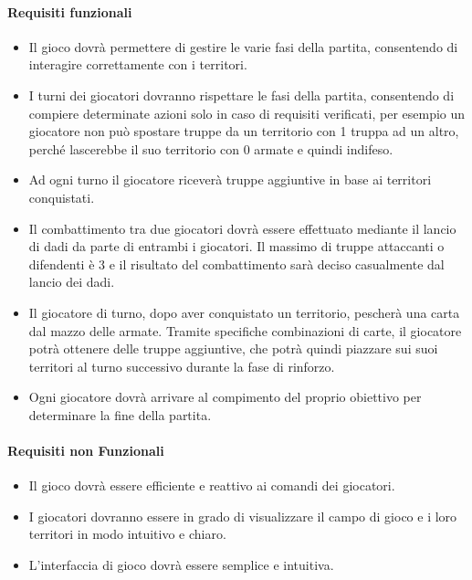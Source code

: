 \documentclass[a4paper,12pt]{report}
\begin{document}
\paragraph{Requisiti funzionali}
%
\begin{itemize}
    \item Il gioco dovr\`a permettere di gestire le varie fasi della partita, consentendo di interagire correttamente con i territori.
    \item I turni dei giocatori dovranno rispettare le fasi della partita, consentendo di compiere determinate azioni solo in caso di requisiti verificati, per esempio un giocatore non pu\`o spostare truppe da un territorio con 1 truppa ad un altro, perch\'e lascerebbe il suo territorio con 0 armate e quindi indifeso.
    \item Ad ogni turno il giocatore ricever\`a truppe aggiuntive in base ai territori conquistati.
    \item Il combattimento tra due giocatori dovr\`a essere effettuato mediante il lancio di dadi da parte di entrambi i giocatori. Il massimo di truppe attaccanti o difendenti \`e 3 e il risultato del combattimento sar\`a deciso casualmente dal lancio dei dadi.
    \item Il giocatore di turno, dopo aver conquistato un territorio, pescher\`a una carta dal mazzo delle armate. Tramite specifiche combinazioni di carte, il giocatore potr\`a ottenere delle truppe aggiuntive, che potr\`a quindi piazzare sui suoi territori al turno successivo durante la fase di rinforzo.
    \item Ogni giocatore dovr\`a arrivare al compimento del proprio obiettivo per determinare la fine della partita.
\end{itemize}
%
\paragraph{Requisiti non Funzionali}
\begin{itemize}
    \item Il gioco dovr\`a essere efficiente e reattivo ai comandi dei giocatori.
    \item I giocatori dovranno essere in grado di visualizzare il campo di gioco e i loro territori in modo intuitivo e chiaro.
    \item L'interfaccia di gioco dovr\`a essere semplice e intuitiva.
\end{itemize}
%
\end{document}
